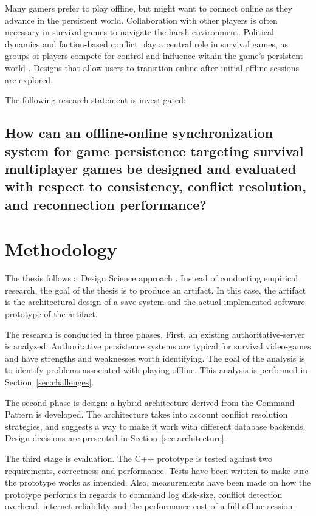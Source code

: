 \documentclass{article}
\begin{document}
Many gamers prefer to play offline, but might want to connect online as they advance in the persistent world. Collaboration with other players is often necessary in survival games to navigate the harsh environment. Political dynamics and faction-based conflict play a central role in survival games, as groups of players compete for control and influence within the game’s persistent world \autocite{CERE2021105}. Designs that allow users to transition online after initial offline sessions are explored.

The following research statement is investigated:

\subsection*{How can an offline-online synchronization system for game persistence targeting survival multiplayer games be designed and evaluated with respect to consistency, conflict resolution, and reconnection performance?}

\newpage

\section{Methodology}

The thesis follows a Design Science approach \autocite{hevner2004design}. Instead of conducting empirical research, the goal of the thesis is to produce an artifact. In this case, the artifact is the architectural design of a save system and the actual implemented software prototype of the artifact.

The research is conducted in three phases. First, an existing authoritative-server is analyzed. Authoritative persistence systems are typical for survival video-games and have strengths and weaknesses worth identifying. The goal of the analysis is to identify problems associated with playing offline. This analysis is performed in Section~\ref{sec:challenges}.

The second phase is design: a hybrid architecture derived from the Command-Pattern is developed. The architecture takes into account conflict resolution strategies, and suggests a way to make it work with different database backends. Design decisions are presented in Section~\ref{sec:architecture}.

The third stage is evaluation. The C++ prototype is tested against two requirements, correctness and performance. Tests have been written to make sure the prototype works as intended. Also, measurements have been made on how the prototype performs in regards to command log disk-size, conflict detection overhead, internet reliability and the performance cost of a full offline session.
\end{document}
